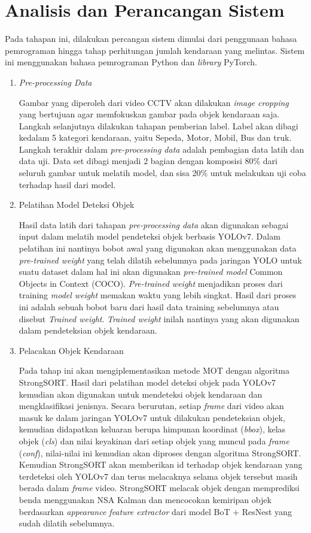 \section{Analisis dan Perancangan Sistem}
Pada tahapan ini, dilakukan percangan sistem dimulai dari penggunaan bahasa pemrograman hingga tahap perhitungan jumlah kendaraan yang melintas. Sistem ini menggunakan bahasa pemrograman Python dan \emph{library} PyTorch.
\begin{enumerate}
\item \emph{Pre-processing Data}

Gambar yang diperoleh dari video CCTV akan dilakukan \emph{image cropping} yang bertujuan agar memfokuskan gambar pada objek kendaraan saja. Langkah selanjutnya dilakukan tahapan pemberian label. Label akan dibagi kedalam 5 kategori kendaraan, yaitu Sepeda, Motor, Mobil, Bus dan truk. Langkah terakhir dalam \emph{pre-processing data} adalah pembagian data latih dan data uji. Data set dibagi menjadi 2 bagian dengan komposisi 80\% dari seluruh gambar untuk melatih model, dan sisa 20\% untuk melakukan uji coba terhadap hasil dari model.

\item Pelatihan Model Deteksi Objek

Hasil data latih dari tahapan \emph{pre-processing data} akan digunakan sebagai input dalam melatih model pendeteksi objek berbasis YOLOv7. Dalam pelatihan ini nantinya bobot awal yang digunakan akan menggunakan data \emph{pre-trained weight} yang telah dilatih sebelumnya pada jaringan YOLO untuk suatu dataset dalam hal ini akan digunakan \emph{pre-trained model} Common Objects in Context (COCO). \emph{Pre-trained weight} menjadikan proses dari training \emph{model weight} memakan waktu yang lebih singkat. Hasil dari proses ini adalah sebuah bobot baru dari hasil data training sebelumnya atau disebut \emph{Trained weight}. \emph{Trained weight} inilah nantinya yang akan digunakan dalam pendeteksian objek kendaraan.

\item Pelacakan Objek Kendaraan

Pada tahap ini akan mengiplementasikan metode MOT dengan algoritma StrongSORT. Hasil dari pelatihan model deteksi objek pada YOLOv7 kemudian akan digunakan untuk mendeteksi objek kendaraan dan mengklasifikasi jenisnya. Secara berurutan, setiap \emph{frame} dari video akan masuk ke dalam jaringan YOLOv7 untuk dilakukan pendeteksian objek, kemudian didapatkan keluaran berupa himpunan koordinat (\emph{bbox}), kelas objek (\emph{cls}) dan nilai keyakinan dari setiap objek yang muncul pada \emph{frame} (\emph{conf}), nilai-nilai ini kemudian akan diproses dengan algoritma StrongSORT. Kemudian StrongSORT akan memberikan id terhadap objek kendaraan yang terdeteksi oleh YOLOv7 dan terus melacaknya selama objek tersebut masih berada dalam \emph{frame} video. StrongSORT melacak objek dengan memprediksi benda menggunakan NSA Kalman dan mencocokan kemiripan objek berdasarkan \emph{appearance feature extractor} dari model BoT + ResNest yang sudah dilatih sebelumnya.


\end{enumerate}
